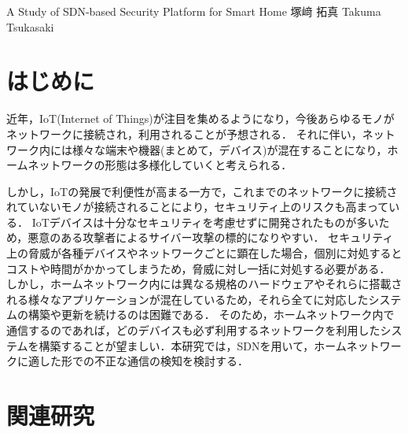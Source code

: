 \documentclass[a4paper,10pt,twocolumn,uplatex]{jsarticle}
\date{9}
\begin{document}
{A Study of SDN-based Security Platform for Smart Home}
{塚﨑 拓真}
{Takuma Tsukasaki}

\section{はじめに}
近年，IoT(Internet of Things)が注目を集めるようになり，今後あらゆるモノがネットワークに接続され，利用されることが予想される．
それに伴い，ネットワーク内には様々な端末や機器(まとめて，デバイス)が混在することになり，ホームネットワークの形態は多様化していくと考えられる．\par
しかし，IoTの発展で利便性が高まる一方で，これまでのネットワークに接続されていないモノが接続されることにより，セキュリティ上のリスクも高まっている\cite{guideline}．
IoTデバイスは十分なセキュリティを考慮せずに開発されたものが多いため，悪意のある攻撃者によるサイバー攻撃の標的になりやすい．
セキュリティ上の脅威が各種デバイスやネットワークごとに顕在した場合，個別に対処するとコストや時間がかかってしまうため，脅威に対し一括に対処する必要がある．
しかし，ホームネットワーク内には異なる規格のハードウェアやそれらに搭載される様々なアプリケーションが混在しているため，それら全てに対応したシステムの構築や更新を続けるのは困難である．
そのため，ホームネットワーク内で通信するのであれば，どのデバイスも必ず利用するネットワークを利用したシステムを構築することが望ましい．本研究では，SDNを用いて，ホームネットワークに適した形での不正な通信の検知を検討する．

\section{関連研究}
\end{document}
